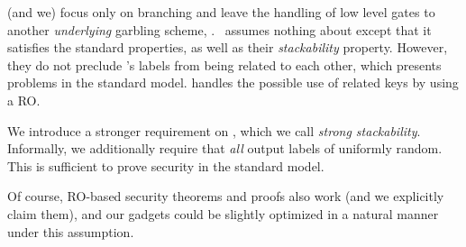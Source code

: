 
\HK (and we)
focus only on branching and leave the handling of low level gates to
another \emph{underlying} garbling scheme, \underscheme.
\HK\ assumes nothing about \underscheme except that it satisfies the standard
\cite{CCS:BelHoaRog12} properties, as well as their {\em stackability} property.
However, they do not preclude \underscheme's
labels from being related to each other, which presents problems in the
standard model. \HK handles the possible use of related keys by using
a RO.

We introduce a stronger requirement on \underscheme, which we call
{\em strong stackability}.  Informally, we additionally require that
{\em all} output labels of \underscheme
uniformly random.  This is sufficient to prove security in the standard model.

Of course, RO-based security theorems and proofs also work (and we explicitly claim them), and our gadgets could be slightly optimized in a natural manner under this assumption.





